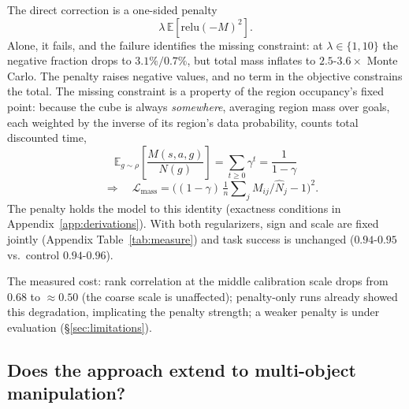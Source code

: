 \documentclass{article}
\newcommand{\E}{\mathbb{E}}
\newcommand{\Nhat}{\hat N}
\begin{document}
The direct correction is a one-sided penalty
\begin{equation}
\lambda\,\E[\mathrm{relu}(-M)^2].
\end{equation}
Alone, it fails, and the failure identifies the missing constraint: at $\lambda\in\{1,10\}$ the negative fraction drops to $3.1\%/0.7\%$, but total mass inflates to $2.5$-$3.6\times$ Monte Carlo.
The penalty raises negative values, and no term in the objective constrains the total.
The missing constraint is a property of the region occupancy's fixed point: because the cube is always \emph{somewhere}, averaging region mass over goals, each weighted by the inverse of its region's data probability, counts total discounted time,
\begin{equation}
\label{eq:mass-anchor}
\E_{g\sim\rho}\!\left[\frac{M(s,a,g)}{N(g)}\right]=\sum_{t\ge0}\gamma^t =\frac{1}{1-\gamma}
\end{equation}
\begin{equation}
\quad\Longrightarrow\quad \mathcal{L}_{\mathrm{mass}} = \Big((1-\gamma)\,\tfrac{1}{n}\sum\nolimits_j M_{ij}/\Nhat_j-1\Big)^{2}.
\end{equation}
The penalty holds the model to this identity (exactness conditions in Appendix~\ref{app:derivations}).
With both regularizers, sign and scale are fixed jointly (Appendix Table~\ref{tab:measure}) and task success is unchanged ($0.94$-$0.95$ vs.\ control $0.94$-$0.96$).

The measured cost: rank correlation at the middle calibration scale drops from $0.68$ to $\approx0.50$ (the coarse scale is unaffected); penalty-only runs already showed this degradation, implicating the penalty strength; a weaker penalty is under evaluation (\S\ref{sec:limitations}).

\subsection{Does the approach extend to multi-object manipulation?}
\label{sec:rq4}\label{sec:multienv-zeroshot}
\end{document}
